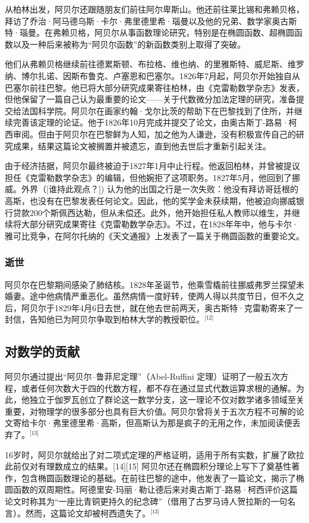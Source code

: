 从柏林出发，阿贝尔还跟随朋友们前往阿尔卑斯山。他还前往莱比锡和弗赖贝格，拜访了乔治·阿马德乌斯·卡尔·弗里德里希·瑙曼以及他的兄弟、数学家奥古斯特·瑙曼。在弗赖贝格，阿贝尔从事函数理论研究，特别是在椭圆函数、超椭圆函数以及一种后来被称为“阿贝尔函数”的新函数类别上取得了突破。

他们从弗赖贝格继续前往德累斯顿、布拉格、维也纳、的里雅斯特、威尼斯、维罗纳、博尔扎诺、因斯布鲁克、卢塞恩和巴塞尔。1826年7月起，阿贝尔开始独自从巴塞尔前往巴黎。他已将大部分研究成果寄往柏林，由《克雷勒数学杂志》发表，但他保留了一篇自己认为最重要的论文——关于代数微分加法定理的研究，准备提交给法国科学院。阿贝尔在画家约翰·戈尔比茨的帮助下在巴黎找到了住所，并继续完善该定理的论证。他于1826年10月完成并提交了论文，由奥古斯丁-路易·柯西审阅。但由于阿贝尔在巴黎鲜为人知，加之他为人谦逊，没有积极宣传自己的研究成果，结果这篇论文被搁置并被遗忘，直到他去世后才重新引起关注。

由于经济拮据，阿贝尔最终被迫于1827年1月中止行程。他返回柏林，并曾被提议担任《克雷勒数学杂志》的编辑，但他婉拒了这项职务。1827年5月，他回到了挪威。外界（[谁持此观点？]) 认为他的出国之行是一次失败：他没有拜访哥廷根的高斯，也没有在巴黎发表任何论文。因此，他的奖学金未获续期，他被迫向挪威银行贷款200个斯佩西达勒，但从未偿还。此外，他开始担任私人教师以维生，并继续将大部分研究成果寄往《克雷勒数学杂志》。不过，在1828年年中，他与卡尔·雅可比竞争，在阿尔托纳的《天文通报》上发表了一篇关于椭圆函数的重要论文。
\subsubsection{逝世}
阿贝尔在巴黎期间感染了肺结核。1828年圣诞节，他乘雪橇前往挪威弗罗兰探望未婚妻。途中他病情严重恶化。虽然病情一度好转，使两人得以共度节日，但不久之后，阿贝尔于1829年4月6日去世，就在他去世前两天，奥古斯特·克雷勒寄来了一封信，告知他已为阿贝尔争取到柏林大学的教授职位。\(^\text{[12]}\)
\subsection{对数学的贡献}
阿贝尔通过提出“阿贝尔–鲁菲尼定理”（Abel-Ruffini 定理）证明了一般五次方程，或者任何次数大于四的代数方程，都不存在通过显式代数运算求根的通解。为此，他独立于伽罗瓦创立了群论这一数学分支，这一理论不仅对数学诸多领域至关重要，对物理学的很多部分也具有巨大价值。阿贝尔曾将关于五次方程不可解的论文寄给卡尔·弗里德里希·高斯，但高斯认为那是疯子的无用之作，未加阅读便丢弃了。\(^\text{[13]}\)

16岁时，阿贝尔就给出了对二项式定理的严格证明，适用于所有实数，扩展了欧拉此前仅对有理数成立的结果。[14][15] 阿贝尔还在椭圆积分理论上写下了奠基性著作，包含椭圆函数理论的基础。在前往巴黎的途中，他发表了一篇论文，揭示了椭圆函数的双周期性。阿德里安-玛丽·勒让德后来对奥古斯丁-路易·柯西评价这篇论文时称其为“一座比青铜更持久的纪念碑”（借用了古罗马诗人贺拉斯的一句名言）。然而，这篇论文却被柯西遗失了。\(^\text{[13]}\)

